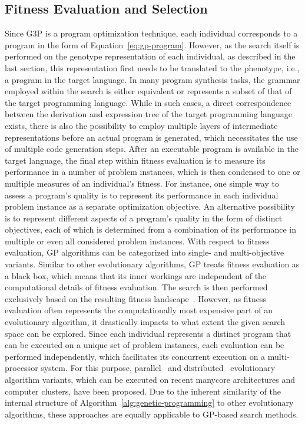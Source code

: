 \subsection{Fitness Evaluation and Selection}
\label{sec:gggp-evaluation-and-selection}
Since G3P is a program optimization technique, each individual corresponds to a program in the form of Equation~\eqref{eq:gp-program}.
However, as the search itself is performed on the genotype representation of each individual, as described in the last section, this representation first needs to be translated to the phenotype, i.e., a program in the target language.
In many program synthesis tasks, the grammar employed within the search is either equivalent or represents a subset of that of the target programming language.
While in such cases, a direct correspondence between the derivation and expression tree of the target programming language exists, there is also the possibility to employ multiple layers of intermediate representations before an actual program is generated, which necessitates the use of multiple code generation steps.
After an executable program is available in the target language, the final step within fitness evaluation is to measure its performance in a number of problem instances, which is then condensed to one or multiple measures of an individual's fitness.
For instance, one simple way to assess a program's quality is to represent its performance in each individual problem instance as a separate optimization objective.
An alternative possibility is to represent different aspects of a program's quality in the form of distinct objectives, each of which is determined from a combination of its performance in multiple or even all considered problem instances.
With respect to fitness evaluation, GP algorithms can be categorized into single- and multi-objective variants.
Similar to other evolutionary algorithms, GP treats fitness evaluation as a black box, which means that its inner workings are independent of the computational details of fitness evaluation.
The search is then performed exclusively based on the resulting fitness landscape~\cite{pitzer2012comprehensive}.
However, as fitness evaluation often represents the computationally most expensive part of an evolutionary algorithm, it drastically impacts to what extent the given search space can be explored.
Since each individual represents a distinct program that can be executed on a unique set of problem instances, each evaluation can be performed independently, which facilitates its concurrent execution on a multi-processor system.
For this purpose, parallel~\cite{sudholt2015parallel} and distributed~\cite{gong2015distributed} evolutionary algorithm variants, which can be executed on recent manycore architectures and computer clusters, have been proposed.
Due to the inherent similarity of the internal structure of Algorithm~\ref{alg:genetic-programming} to other evolutionary algorithms, these approaches are equally applicable to GP-based search methods.

